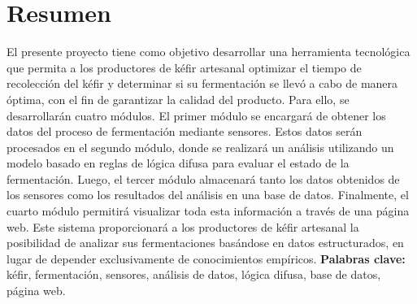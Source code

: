 \section*{Resumen}

El presente proyecto tiene como objetivo desarrollar una herramienta tecnológica
que permita a los productores de kéfir artesanal optimizar el tiempo de recolección
del kéfir y determinar si su fermentación se llevó a cabo de manera óptima, con el
fin de garantizar la calidad del producto. Para ello, se desarrollarán cuatro módulos.
El primer módulo se encargará de obtener los datos del proceso de fermentación
mediante sensores. Estos datos serán procesados en el segundo módulo, donde se
realizará un análisis utilizando un modelo basado en reglas de lógica difusa para
evaluar el estado de la fermentación. Luego, el tercer módulo almacenará tanto los
datos obtenidos de los sensores como los resultados del análisis en una base de
datos. Finalmente, el cuarto módulo permitirá visualizar toda esta información a
través de una página web. Este sistema proporcionará a los productores de kéfir
artesanal la posibilidad de analizar sus fermentaciones basándose en datos
estructurados, en lugar de depender exclusivamente de conocimientos empíricos.
\newline
\newline
\noindent \textbf{Palabras clave:} kéfir, fermentación, sensores, análisis de datos, lógica difusa, base de datos, página web.
